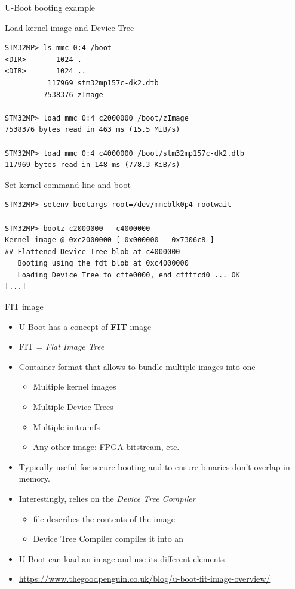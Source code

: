 \begin{frame}[fragile]{U-Boot booting example}
  \begin{block}{Load kernel image and Device Tree}
    {\tiny
\begin{verbatim}
STM32MP> ls mmc 0:4 /boot
<DIR>       1024 .
<DIR>       1024 ..
          117969 stm32mp157c-dk2.dtb
         7538376 zImage

STM32MP> load mmc 0:4 c2000000 /boot/zImage
7538376 bytes read in 463 ms (15.5 MiB/s)

STM32MP> load mmc 0:4 c4000000 /boot/stm32mp157c-dk2.dtb
117969 bytes read in 148 ms (778.3 KiB/s)
\end{verbatim}
    }
  \end{block}

  \begin{block}{Set kernel command line and boot}
    {\tiny
\begin{verbatim}
STM32MP> setenv bootargs root=/dev/mmcblk0p4 rootwait

STM32MP> bootz c2000000 - c4000000
Kernel image @ 0xc2000000 [ 0x000000 - 0x7306c8 ]
## Flattened Device Tree blob at c4000000
   Booting using the fdt blob at 0xc4000000
   Loading Device Tree to cffe0000, end cffffcd0 ... OK
[...]
\end{verbatim}
    }
  \end{block}
\end{frame}

\begin{frame}{FIT image}
  \begin{itemize}
  \item U-Boot has a concept of {\bf FIT} image
  \item FIT = {\em Flat Image Tree}
  \item Container format that allows to bundle multiple images into
    one
    \begin{itemize}
    \item Multiple kernel images
    \item Multiple Device Trees
    \item Multiple initramfs
    \item Any other image: FPGA bitstream, etc.
    \end{itemize}
  \item Typically useful for secure booting and to ensure binaries
	don't overlap in memory.
  \item Interestingly, relies on the {\em Device Tree Compiler}
    \begin{itemize}
    \item {} file describes the contents of the image
    \item Device Tree Compiler compiles it into an 
    \end{itemize}
  \item U-Boot can load an  image and use its different
    elements
  \item \url{https://www.thegoodpenguin.co.uk/blog/u-boot-fit-image-overview/}
  \end{itemize}
\end{frame}

